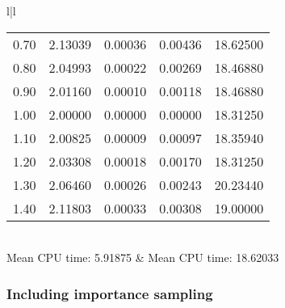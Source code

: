 \begin{table}[H]
\begin{tabular}{l|l}
\begin{tabular}{ccccc}
0.70 & 2.13039 & 0.00036 & 0.00436 & 18.62500\\
0.80 & 2.04993 & 0.00022 & 0.00269 & 18.46880\\
0.90 & 2.01160 & 0.00010 & 0.00118 & 18.46880\\
1.00 & 2.00000 & 0.00000 & 0.00000 & 18.31250\\
1.10 & 2.00825 & 0.00009 & 0.00097 & 18.35940\\
1.20 & 2.03308 & 0.00018 & 0.00170 & 18.31250\\
1.30 & 2.06460 & 0.00026 & 0.00243 & 20.23440\\
1.40 & 2.11803 & 0.00033 & 0.00308 & 19.00000\\ \hline
\end{tabular}\\
Mean CPU time: 5.91875 & Mean CPU time:  18.62033\\
\end{tabular}
\end{table}

\subsubsection{Including importance sampling}

